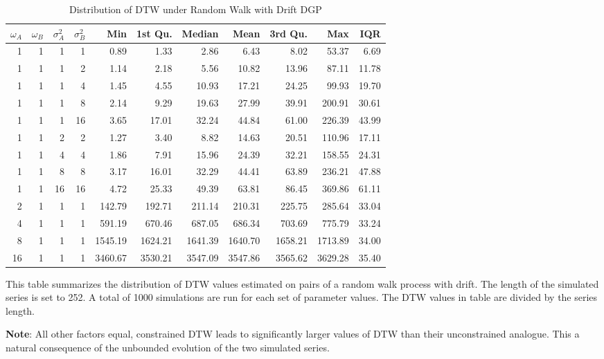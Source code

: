 \documentclass[12pt]{report}
\begin{document}
\begin{table}[!ht]
\begin{center}
\begin{tabular}{r r r r | r r r r r r r}
        \midrule
        $\omega_{A}$ & $\omega_{B}$ & $\sigma^{2}_{A}$ & $\sigma^{2}_{B}$ & Min & 1st Qu. & Median & Mean & 3rd Qu. & Max & IQR \\
        \midrule
        1  & 1 & 1  & 1  &    0.89 &    1.33 &    2.86 &    6.43 &    8.02 &   53.37 &  6.69 \\
        \midrule
        1  & 1 & 1  & 2  &    1.14 &    2.18 &    5.56 &   10.82 &   13.96 &   87.11 & 11.78 \\
        1  & 1 & 1  & 4  &    1.45 &    4.55 &   10.93 &   17.21 &   24.25 &   99.93 & 19.70 \\
        1  & 1 & 1  & 8  &    2.14 &    9.29 &   19.63 &   27.99 &   39.91 &  200.91 & 30.61 \\
        1  & 1 & 1  & 16 &    3.65 &   17.01 &   32.24 &   44.84 &   61.00 &  226.39 & 43.99 \\
        \midrule
        1  & 1 & 2  & 2  &    1.27 &    3.40 &    8.82 &   14.63 &   20.51 &  110.96 & 17.11 \\
        1  & 1 & 4  & 4  &    1.86 &    7.91 &   15.96 &   24.39 &   32.21 &  158.55 & 24.31 \\
        1  & 1 & 8  & 8  &    3.17 &   16.01 &   32.29 &   44.41 &   63.89 &  236.21 & 47.88 \\
        1  & 1 & 16 & 16 &    4.72 &   25.33 &   49.39 &   63.81 &   86.45 &  369.86 & 61.11 \\
        \midrule
        2  & 1 & 1  & 1  &  142.79 &  192.71 &  211.14 &  210.31 &  225.75 &  285.64 & 33.04 \\
        4  & 1 & 1  & 1  &  591.19 &  670.46 &  687.05 &  686.34 &  703.69 &  775.79 & 33.24 \\
        8  & 1 & 1  & 1  & 1545.19 & 1624.21 & 1641.39 & 1640.70 & 1658.21 & 1713.89 & 34.00 \\
        16 & 1 & 1  & 1  & 3460.67 & 3530.21 & 3547.09 & 3547.86 & 3565.62 & 3629.28 & 35.40 \\
        \hline
      \end{tabular}
    \caption{Distribution of DTW under Random Walk with Drift DGP} \label{tbl:dtw_random_walk_with_drift}
    \end{center}
    \begin{tablenotes}
        \item{\footnotesize This table summarizes the distribution of DTW values estimated on pairs of a random walk process with drift. The length of the simulated series is set to 252. A total of 1000 simulations are run for each set of parameter values. The DTW values in table are divided by the series length.}
        \item {\footnotesize \textbf{Note}: All other factors equal, constrained DTW leads to significantly larger values of DTW than their unconstrained analogue. This a natural consequence of the unbounded evolution of the two simulated series.}
    \end{tablenotes}
\end{table}
\end{document}
